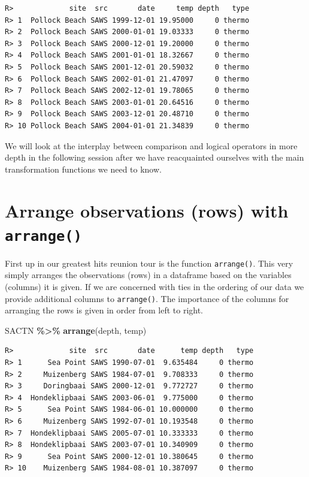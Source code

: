 \documentclass[
]{book}
\newenvironment{Shaded}{\begin{snugshade}}{\end{snugshade}}
\newcommand{\KeywordTok}[1]{\textcolor[rgb]{0.13,0.29,0.53}{\textbf{#1}}}
\newcommand{\NormalTok}[1]{#1}
\newcommand{\OperatorTok}[1]{\textcolor[rgb]{0.81,0.36,0.00}{\textbf{#1}}}
\newcommand{\StringTok}[1]{\textcolor[rgb]{0.31,0.60,0.02}{#1}}
\begin{document}
\begin{verbatim}
R>             site  src       date     temp depth   type
R> 1  Pollock Beach SAWS 1999-12-01 19.95000     0 thermo
R> 2  Pollock Beach SAWS 2000-01-01 19.03333     0 thermo
R> 3  Pollock Beach SAWS 2000-12-01 19.20000     0 thermo
R> 4  Pollock Beach SAWS 2001-01-01 18.32667     0 thermo
R> 5  Pollock Beach SAWS 2001-12-01 20.59032     0 thermo
R> 6  Pollock Beach SAWS 2002-01-01 21.47097     0 thermo
R> 7  Pollock Beach SAWS 2002-12-01 19.78065     0 thermo
R> 8  Pollock Beach SAWS 2003-01-01 20.64516     0 thermo
R> 9  Pollock Beach SAWS 2003-12-01 20.48710     0 thermo
R> 10 Pollock Beach SAWS 2004-01-01 21.34839     0 thermo
\end{verbatim}

We will look at the interplay between comparison and logical operators in more depth in the following session after we have reacquainted ourselves with the main transformation functions we need to know.

\hypertarget{arrange-observations-rows-with-arrange}{%
\section{\texorpdfstring{Arrange observations (rows) with \texttt{arrange()}}{Arrange observations (rows) with arrange()}}\label{arrange-observations-rows-with-arrange}}

First up in our greatest hits reunion tour is the function \texttt{arrange()}. This very simply arranges the observations (rows) in a dataframe based on the variables (columns) it is given. If we are concerned with ties in the ordering of our data we provide additional columns to \texttt{arrange()}. The importance of the columns for arranging the rows is given in order from left to right.

\begin{Shaded}
\begin{Highlighting}[]
\NormalTok{SACTN }\OperatorTok{\%>\%}\StringTok{ }
\StringTok{  }\KeywordTok{arrange}\NormalTok{(depth, temp)}
\end{Highlighting}
\end{Shaded}

\begin{verbatim}
R>             site  src       date      temp depth   type
R> 1      Sea Point SAWS 1990-07-01  9.635484     0 thermo
R> 2     Muizenberg SAWS 1984-07-01  9.708333     0 thermo
R> 3     Doringbaai SAWS 2000-12-01  9.772727     0 thermo
R> 4  Hondeklipbaai SAWS 2003-06-01  9.775000     0 thermo
R> 5      Sea Point SAWS 1984-06-01 10.000000     0 thermo
R> 6     Muizenberg SAWS 1992-07-01 10.193548     0 thermo
R> 7  Hondeklipbaai SAWS 2005-07-01 10.333333     0 thermo
R> 8  Hondeklipbaai SAWS 2003-07-01 10.340909     0 thermo
R> 9      Sea Point SAWS 2000-12-01 10.380645     0 thermo
R> 10    Muizenberg SAWS 1984-08-01 10.387097     0 thermo
\end{verbatim}
\end{document}
